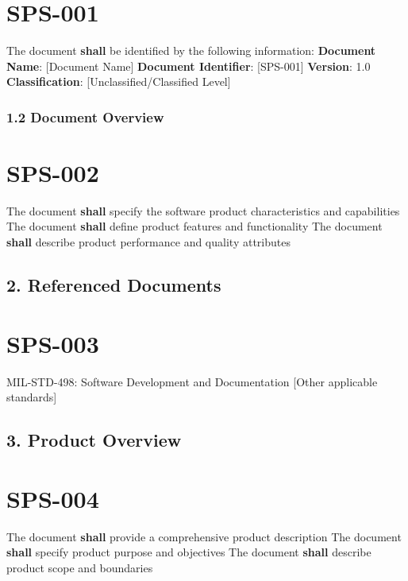 \section{SPS-001}\label{SPS-001}

The document \textbf{shall} be identified by the following information:
\textbf{Document Name}: [Document Name]
\textbf{Document Identifier}: [SPS-001]
\textbf{Version}: 1.0
\textbf{Classification}: [Unclassified/Classified Level]

\subsubsection{1.2 Document Overview}

\section{SPS-002}\label{SPS-002}

The document \textbf{shall} specify the software product characteristics and capabilities
The document \textbf{shall} define product features and functionality
The document \textbf{shall} describe product performance and quality attributes

\subsection{2. Referenced Documents}

\section{SPS-003}\label{SPS-003}

MIL-STD-498: Software Development and Documentation
[Other applicable standards]\\

\subsection{3. Product Overview}

\section{SPS-004}\label{SPS-004}

The document \textbf{shall} provide a comprehensive product description
The document \textbf{shall} specify product purpose and objectives
The document \textbf{shall} describe product scope and boundaries

